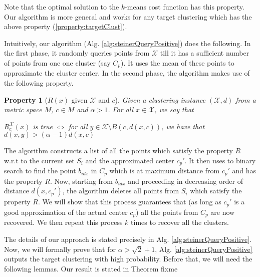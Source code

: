 \documentclass[11pt]{article}
\newtheorem{property}[theorem]{Property}
\newcommand{\mc}{\mathcal}
\begin{document}
Note that the optimal solution to the $k$-means cost function has this property. Our algorithm is more general and works for any target clustering which has the above property (\ref{property:targetClust}).

Intuitively, our algorithm (Alg. \ref{alg:steinerQueryPositive}) does the following. In the first phase, it randomly queries points from $\mc X$ till it has a sufficient number of points from one one cluster (say $C_p$). It uses the mean of these points to approximate the cluster center. In the second phase, the algorithm makes use of the following property. 
\begin{property}[$R(x)$ given $\mc X$ and $c$]
\label{property:R}
Given a clustering instance $(\mc X, d)$ from a metric space $M$, $c \in M$ and $\alpha > 1$. For all $x \in \mc X$, we say that
\begin{center}
$R_{c}^{\mc X}(x)$ is true $\iff$ for all $y \in \mc X \setminus B(c, d(x, c))$, we have that $d(x, y) > (\alpha-1)d(x, c)$
\end{center}
\end{property} 
\noindent The algorithm constructs a list of all the points which satisfy the property $R$ w.r.t to the current set $S_i$ and the approximated center $c_p'$. It then uses to binary search to find the point $b_{idx}$ in $C_p$ which is at maximum distance from $c_p'$ and has the property $R$. Now, starting from $b_{idx}$ and proceeding in decreasing order of distance $d(x, c_p')$, the algorithm deletes all points from $S_i$ which satisfy the property $R$. We will show that this process guarantees that (as long as $c_p'$ is a good approximation of the actual center $c_p$) all the points from $C_p$ are now recovered. We then repeat this process $k$ times to recover all the clusters.

The details of our approach is stated precisely in Alg. \ref{alg:steinerQueryPositive}. Now, we will formally prove that for $\alpha > \sqrt{2} + 1$, Alg. \ref{alg:steinerQueryPositive} outputs the target clustering with high probability. Before that, we will need the following lemmas. Our result is stated in Theorem {\color{red} fixme}
\end{document}
